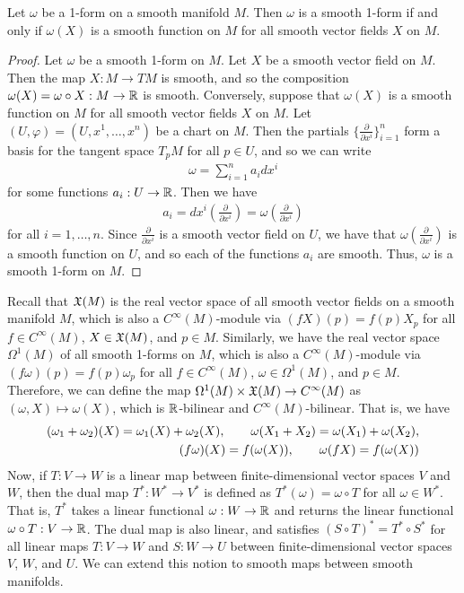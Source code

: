 \begin{proposition}
    Let $\omega$ be a 1-form on a smooth manifold $M$. Then $\omega$ is a smooth 1-form if and only if $\omega(X)$ is a smooth function on $M$ for all smooth vector fields $X$ on $M$.
\end{proposition}
\begin{proof}
    Let $\omega$ be a smooth 1-form on $M$. Let $X$ be a smooth vector field on $M$. Then the map $X:M \to TM$ is smooth, and so the composition $\omega(X) = \omega \circ X:M \to \mathbb{R}$ is smooth. Conversely, suppose that $\omega(X)$ is a smooth function on $M$ for all smooth vector fields $X$ on $M$. Let $(U,\varphi) = (U,x^{1},\ldots,x^{n})$ be a chart on $M$. Then the partials $\{\frac{\partial}{\partial x^{i}}\}_{i=1}^{n}$ form a basis for the tangent space $T_{p}M$ for all $p \in U$, and so we can write
    \begin{align}
        \omega = \sum_{i=1}^{n} a_{i} dx^{i}
    \end{align}
    for some functions $a_{i}:U \to \mathbb{R}$. Then we have
    \begin{align}
        a_{i} = dx^{i}\left(\frac{\partial}{\partial x^{i}}\right) = \omega\left(\frac{\partial}{\partial x^{i}}\right)
    \end{align}
    for all $i = 1,\ldots,n$. Since $\frac{\partial}{\partial x^{i}}$ is a smooth vector field on $U$, we have that $\omega\left(\frac{\partial}{\partial x^{i}}\right)$ is a smooth function on $U$, and so each of the functions $a_{i}$ are smooth. Thus, $\omega$ is a smooth 1-form on $M$.
\end{proof}

Recall that $\mathfrak{X}(M)$ is the real vector space of all smooth vector fields on a smooth manifold $M$, which is also a $C^{\infty}(M)$-module via $(fX)(p) = f(p)X_{p}$ for all $f \in C^{\infty}(M)$, $X \in \mathfrak{X}(M)$, and $p \in M$. Similarly, we have the real vector space $\Omega^{1}(M)$ of all smooth 1-forms on $M$, which is also a $C^{\infty}(M)$-module via $(f\omega)(p) = f(p)\omega_{p}$ for all $f \in C^{\infty}(M)$, $\omega \in \Omega^{1}(M)$, and $p \in M$. Therefore, we can define the map $\Omega^{1}(M) \times \mathfrak{X}(M) \to C^{\infty}(M)$ as $(\omega,X) \mapsto \omega(X)$, which is $\mathbb{R}$-bilinear and $C^{\infty}(M)$-bilinear. That is, we have
\begin{align}
    (\omega_{1}+\omega_{2})(X) = \omega_{1}(X) + \omega_{2}(X), \qquad \omega(X_{1}+X_{2}) = \omega(X_{1}) + \omega(X_{2}), \notag \\ (f\omega)(X) = f(\omega(X)), \qquad \omega(fX) = f(\omega(X))
\end{align}
Now, if $T:V \to W$ is a linear map between finite-dimensional vector spaces $V$ and $W$, then the dual map $T^{\ast}:W^{\ast} \to V^{\ast}$ is defined as $T^{\ast}(\omega) = \omega \circ T$ for all $\omega \in W^{\ast}$. That is, $T^{\ast}$ takes a linear functional $\omega:W \to \mathbb{R}$ and returns the linear functional $\omega \circ T:V \to \mathbb{R}$. The dual map is also linear, and satisfies $(S \circ T)^{\ast} = T^{\ast} \circ S^{\ast}$ for all linear maps $T:V \to W$ and $S:W \to U$ between finite-dimensional vector spaces $V$, $W$, and $U$. We can extend this notion to smooth maps between smooth manifolds.

